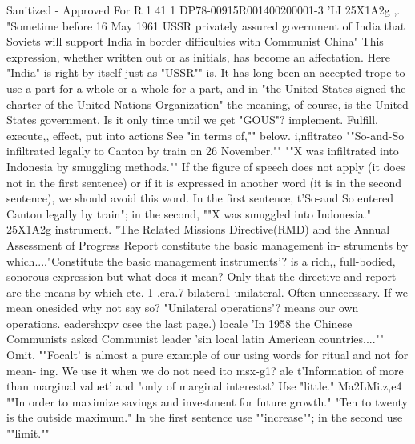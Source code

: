 \documentclass[
    oneside,
    11pt,
    draft
]{memoir}
\begin{document}
Sanitized - Approved For R 1 41 1 DP78-00915R001400200001-3 'LI 25X1A2g ,. "Sometime before 16 May 1961 USSR privately assured government of India that Soviets will support India in border difficulties with Communist China" This expression, whether written out or as initials, has become an affectation. Here "India" is right by itself just as "USSR"" is. It has long been an accepted trope to use a part for a whole or a whole for a part, and in "the United States signed the charter of the United Nations Organization" the meaning, of course, is the United States government. Is it only time until we get "GOUS"? implement. Fulfill, execute,, effect, put into actions See "in terms of,"" below. i,nfltrateo ""So-and-So infiltrated legally to Canton by train on 26 November."" ""X was infiltrated into Indonesia by smuggling methods."" If the figure of speech does not apply (it does not in the first sentence) or if it is expressed in another word (it is in the second sentence), we should avoid this word. In the first sentence, t'So-and So entered Canton legally by train"; in the second, ""X was smuggled into Indonesia." 25X1A2g instrument. "The Related Missions Directive(RMD) and the Annual Assessment of Progress Report constitute the basic management in- struments by which...."Constitute the basic management instruments'? is a rich,, full-bodied, sonorous expression but what does it mean? Only that the directive and report are the means by which etc. 1 .era.7 bilatera1 unilateral. Often unnecessary. If we mean onesided why not say so? "Unilateral operations'? means our own operations. eadershxpv csee the last page.) locale 'In 1958 the Chinese Communists asked Communist leader 'sin local latin American countries...."" Omit. ""Focalt' is almost a pure example of our using words for ritual and not for mean- ing. We use it when we do not need ito msx-g1? ale t'Information of more than marginal valuet' and "only of marginal interestst' Use "little." Ma2LMi.z,e4 ""In order to maximize savings and investment for future growth." "Ten to twenty is the outside maximum." In the first sentence use ""increase""; in the second use ""limit.""
\end{document}
